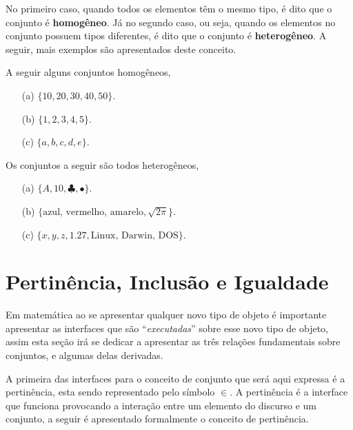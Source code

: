 \normalfont No primeiro caso, quando todos os elementos têm o mesmo tipo, é dito que o conjunto é \textbf{homogêneo}. Já no segundo caso, ou seja, quando os elementos no conjunto possuem tipos diferentes, é dito que o conjunto é \textbf{heterogêneo}. A seguir, mais exemplos são apresentados deste conceito.

\begin{exemplo}\label{exe:ConjuntoHomogeneo1}
  A seguir alguns conjuntos homogêneos, 
  \begin{itemize}
    \item[(a)] $\{10, 20, 30, 40, 50\}$.
    \item[(b)] $\{1, 2, 3, 4, 5\}$.
    \item[(c)] $\{a, b, c, d, e\}$.
  \end{itemize}
\end{exemplo}

\begin{exemplo}\label{exe:ConjuntoHeterogeneo1}
  Os conjuntos a seguir são todos heterogêneos,
  \begin{itemize}
    \item[(a)] $\{A, 10, \clubsuit, \bullet\}$.
    \item[(b)] $\{\text{azul, vermelho, amarelo}, \sqrt{2\pi}\}$.
    \item[(c)] $\{x, y, z, 1.27, \text{Linux, Darwin, DOS}\}$.
  \end{itemize}
\end{exemplo}

\section{Pertinência, Inclusão e Igualdade}\label{sec:RelacoesFundamentais}

Em matemática ao se apresentar qualquer novo tipo de objeto é importante apresentar as interfaces que são ``\textit{executadas}'' sobre esse novo tipo de objeto, assim esta seção irá se dedicar a apresentar as três relações fundamentais sobre conjuntos, e algumas delas derivadas. 

A primeira das interfaces para o conceito de conjunto que será aqui expressa é a pertinência, esta sendo representado pelo símbolo $\in$. A pertinência é a interface que funciona provocando a interação entre um elemento do discurso e um conjunto, a seguir é apresentado formalmente o conceito de pertinência.

